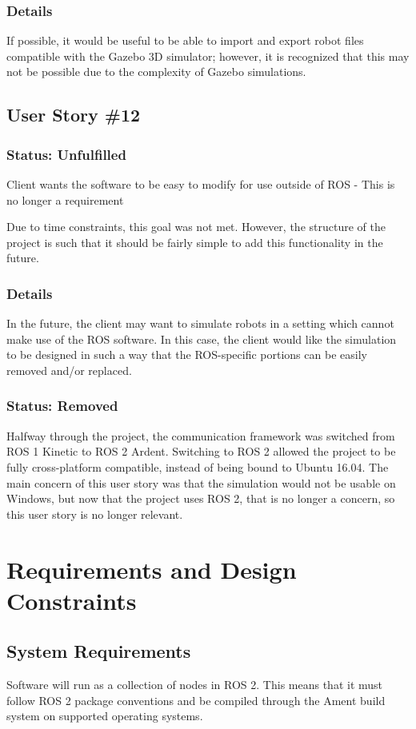 {\subsubsection*{Details}
If possible, it would be useful to be able to import and export robot files compatible with the Gazebo 3D simulator; however, it is recognized that this may not be possible due to the complexity of Gazebo simulations.

\subsection{User Story \#12\label{us:12}} 
\subsubsection*{Status: Unfulfilled}
Client wants the software to be easy to modify for use outside of ROS - This is no longer a requirement

Due to time constraints, this goal was not met. However, the structure of the project is such that it should be fairly simple to add this functionality in the future.

\subsubsection*{Details}
In the future, the client may want to simulate robots in a setting which cannot make use of the ROS software. In this case, the client would like the simulation to be designed in such a way that the ROS-specific portions can be easily removed and/or replaced.

\subsubsection*{Status: Removed}
Halfway through the project, the communication framework was switched from ROS 1 Kinetic to ROS 2 Ardent. Switching to ROS 2 allowed the project to be fully cross-platform compatible, instead of being bound to Ubuntu 16.04. The main concern of this user story was that the simulation would not be usable on Windows, but now that the project uses ROS 2, that is no longer a concern, so this user story is no longer relevant.

\section{Requirements and Design Constraints}
\subsection{System  Requirements}
Software will run as a collection of nodes in ROS 2. This means that it must follow ROS 2 package conventions and be compiled through the Ament build system on supported operating systems.

}
